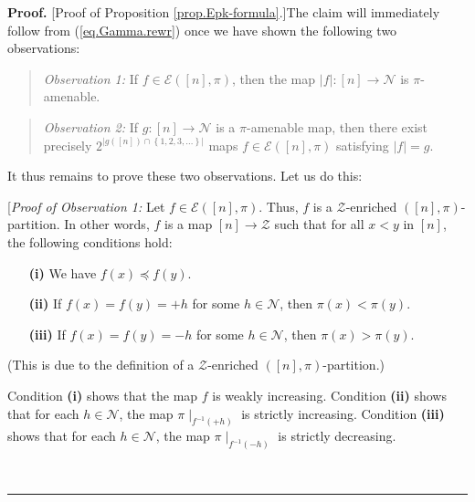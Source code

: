 \documentclass[numbers=enddot,12pt,final,onecolumn,notitlepage]{scrartcl}%
\theoremstyle{definition}
\newenvironment{statement}{\begin{quote}}{\end{quote}}
\newenvironment{proof}[1][Proof]{\noindent\textbf{#1.} }{\ \rule{0.5em}{0.5em}}
\newenvironment{vershort}{}{}
\begin{document}
\begin{vershort}
\begin{proof}
[Proof of Proposition \ref{prop.Epk-formula}.]The claim will immediately
follow from (\ref{eq.Gamma.rewr}) once we have shown the following two observations:

\begin{statement}
\textit{Observation 1:} If $f\in\mathcal{E}\left(  \left[  n\right]
,\pi\right)  $, then the map $\left\vert f\right\vert :\left[  n\right]
\rightarrow\mathcal{N}$ is $\pi$-amenable.
\end{statement}

\begin{statement}
\textit{Observation 2:} If $g:\left[  n\right]  \rightarrow\mathcal{N}$ is a
$\pi$-amenable map, then there exist precisely $2^{\left\vert g\left(  \left[
n\right]  \right)  \cap\left\{  1,2,3,\ldots\right\}  \right\vert }$ maps
$f\in\mathcal{E}\left(  \left[  n\right]  ,\pi\right)  $ satisfying
$\left\vert f\right\vert =g$.
\end{statement}

It thus remains to prove these two observations. Let us do this:

[\textit{Proof of Observation 1:} Let $f\in\mathcal{E}\left(  \left[
n\right]  ,\pi\right)  $. Thus, $f$ is a $\mathcal{Z}$-enriched $\left(
\left[  n\right]  ,\pi\right)  $-partition. In other words, $f$ is a map
$\left[  n\right]  \rightarrow\mathcal{Z}$ such that for all $x<y$ in $\left[
n\right]  $, the following conditions hold:

\begin{enumerate}
\item[\textbf{(i)}] We have $f\left(  x\right)  \preccurlyeq f\left(
y\right)  $.

\item[\textbf{(ii)}] If $f\left(  x\right)  =f\left(  y\right)  =+h$ for some
$h\in\mathcal{N}$, then $\pi\left(  x\right)  <\pi\left(  y\right)  $.

\item[\textbf{(iii)}] If $f\left(  x\right)  =f\left(  y\right)  =-h$ for some
$h\in\mathcal{N}$, then $\pi\left(  x\right)  >\pi\left(  y\right)  $.
\end{enumerate}

(This is due to the
definition of a $\mathcal{Z}$-enriched $\left(  \left[  n\right]  ,\pi\right)
$-partition.)

Condition \textbf{(i)} shows that the map $f$ is weakly increasing. Condition
\textbf{(ii)} shows that for each $h\in\mathcal{N}$, the map $\pi\mid
_{f^{-1}\left(  +h\right)  }$ is strictly increasing. Condition \textbf{(iii)}
shows that for each $h\in\mathcal{N}$, the map $\pi\mid_{f^{-1}\left(
-h\right)  }$ is strictly decreasing.


\end{proof}
\end{vershort}
\end{document}
